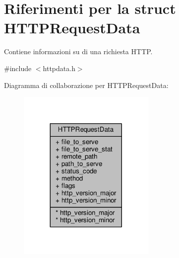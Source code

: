 \hypertarget{structHTTPRequestData}{}\section{Riferimenti per la struct H\+T\+T\+P\+Request\+Data}
\label{structHTTPRequestData}


Contiene informazioni su di una richiesta H\+T\+T\+P.  




{\ttfamily \#include $<$httpdata.\+h$>$}



Diagramma di collaborazione per H\+T\+T\+P\+Request\+Data\+:\nopagebreak
\begin{figure}[H]
\begin{center}
\leavevmode
\includegraphics[width=188pt]{structHTTPRequestData__coll__graph}
\end{center}
\end{figure}
